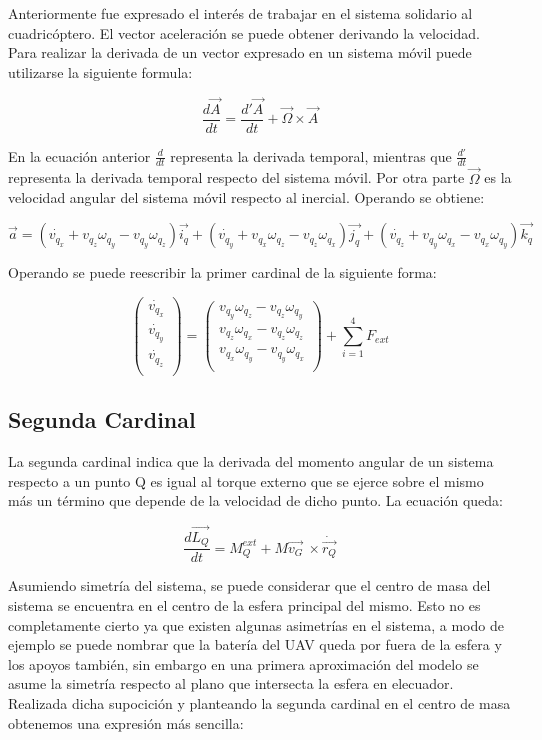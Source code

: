 \documentclass[main]{subfiles}
\begin{document}
Anteriormente fue expresado el inter\'es de trabajar en el sistema solidario al cuadric\'optero. 
El vector aceleraci\'on se puede obtener derivando la velocidad. Para realizar la derivada de un vector expresado en un sistema m\'ovil puede utilizarse la siguiente formula:

$$\frac{d\vec{A}}{dt} =\frac{d\prime\vec{A}}{dt}+\vec{\Omega}\times\vec{A} $$

En la ecuaci\'on anterior $\frac{d}{dt}$ representa la derivada temporal, mientras que $\frac{d\prime}{dt}$ representa la derivada temporal respecto del sistema m\'ovil. Por otra parte $\vec{\Omega}$ es la velocidad angular del sistema m\'ovil respecto al inercial. Operando se obtiene: 

$$\vec{a} = (\dot{v_{q_x}}+v_{q_z} \omega_{q_y} - v_{q_y} \omega_{q_z} )\vec{i_q} + (\dot{v_{q_y}}+v_{q_x} \omega_{q_z} - v_{q_z} \omega_{q_x} )\vec{j_q}+(\dot{v_{q_z}}+v_{q_y} \omega_{q_x} - v_{q_x} \omega_{q_y} )\vec{k_q} $$



Operando se puede reescribir la primer cardinal de la siguiente forma:

$$
\left(\begin{array}{c}\dot{v_{q_x}}\\
\dot{v_{q_y}}\\
\dot{v_{q_z}}\\
\end{array} \right) = \left(\begin{array}{c}
v_{q_y} \omega_{q_z} - v_{q_z} \omega_{q_y}	\\
v_{q_z} \omega_{q_x} - v_{q_z} \omega_{q_z}\\
v_{q_x} \omega_{q_y} - v_{q_y} \omega_{q_x}\\
\end{array}\right) + \sum_{i=1}^4 F_{ext} 
$$


\subsection{Segunda Cardinal}

La segunda cardinal indica que la derivada del momento angular de un sistema respecto a un punto Q es igual al torque externo que se ejerce sobre el mismo m\'as un t\'ermino que depende de la velocidad de dicho punto. La ecuaci\'on queda:

$$\frac{d\vec{L_Q}}{dt} =M_Q^{ext}+M\vec{v_G}\ \times \dot{\vec{r_Q}} $$

Asumiendo simetr\'ia del sistema, se puede considerar que el centro de masa del sistema se encuentra en el centro de la esfera principal del mismo. Esto no es completamente cierto ya que existen algunas asimetr\'ias en el sistema, a modo de ejemplo se puede nombrar que la bater\'ia del UAV queda por fuera de la esfera y los apoyos tambi\'en, sin embargo en una primera aproximaci\'on del modelo se asume la simetr\'ia respecto al plano que intersecta la esfera en elecuador. Realizada dicha supocici\'on y planteando la segunda cardinal en el centro de masa obtenemos una expresi\'on m\'as sencilla:
\end{document}
